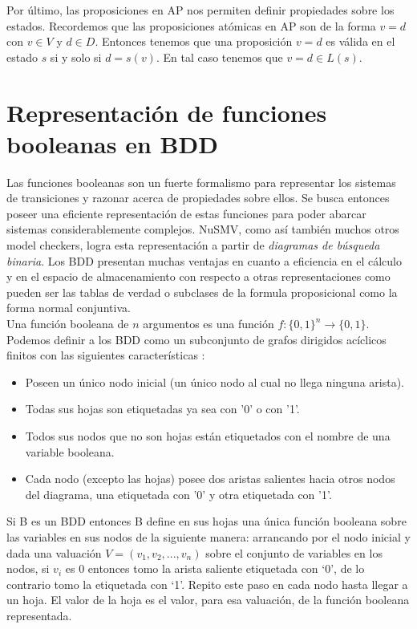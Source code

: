 \documentclass[titlepage, 12pt]{book}
\begin{document}
Por \'ultimo, las proposiciones en AP nos permiten definir propiedades sobre los estados. Recordemos que las proposiciones at\'omicas en AP son de la forma $v=d$ con $v \in V$ y $d \in D$. Entonces tenemos que una proposici\'on $v=d$ es v\'alida en el estado $s$ si y solo si $d = s(v)$. En tal caso tenemos que $v=d \in L(s)$.








\section{Representaci\'on de funciones booleanas en BDD}

Las funciones booleanas son un fuerte formalismo para representar los sistemas de transiciones y razonar acerca de propiedades sobre ellos. Se busca entonces poseer una eficiente representaci\'on de estas funciones para poder abarcar sistemas considerablemente complejos. NuSMV, como as\'i tambi\'en muchos otros model checkers, logra esta representaci\'on a partir de \textit{diagramas de b\'usqueda binaria}. Los BDD presentan muchas ventajas en cuanto a eficiencia en el c\'alculo y en el espacio de almacenamiento con respecto a otras representaciones como pueden ser las tablas de verdad o subclases de la formula proposicional como la forma normal conjuntiva.\\

Una funci\'on booleana de $n$ argumentos es una funci\'on $f : \{0,1\}^n \to \{0,1\}$. Podemos definir a los BDD como un subconjunto de grafos dirigidos ac\'iclicos finitos con las siguientes caracter\'isticas \cite{Huth}:
\begin{itemize}
\item Poseen un \'unico nodo inicial (un \'unico nodo al cual no llega ninguna arista).
\item Todas sus hojas son etiquetadas ya sea con '0' o con '1'.
\item Todos sus nodos que no son hojas est\'an etiquetados con el nombre de una variable booleana.
\item Cada nodo (excepto las hojas) posee dos aristas salientes hacia otros nodos del diagrama, una etiquetada con '0' y otra etiquetada con '1'.
\end{itemize}

Si B es un BDD entonces B define en sus hojas una \'unica funci\'on booleana sobre las variables en sus nodos de la siguiente manera: arrancando por el nodo inicial y dada una valuaci\'on $V=(v_1,v_2,...,v_n)$ sobre el conjunto de variables en los nodos, si $v_i$ es $0$ entonces tomo la arista saliente etiquetada con `0', de lo contrario tomo la etiquetada con `1'. Repito este paso en cada nodo hasta llegar a un hoja. El valor de la hoja es el valor, para esa valuaci\'on, de la funci\'on booleana representada.
\end{document}
